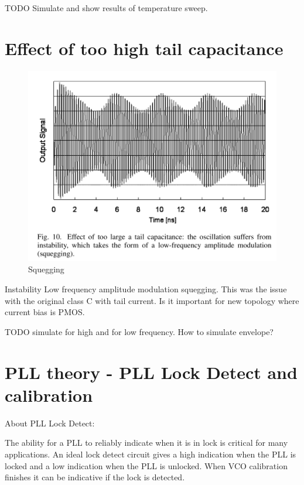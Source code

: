 \documentclass{article}
\begin{document}

TODO Simulate and show results of temperature sweep.


\section{Effect of too high tail capacitance}

\begin{figure}[!ht]
	\includegraphics[width=\linewidth]{Figures/squegging.png}
	\caption{Squegging}
	\label{fig:squegging}
\end{figure}

Instability Low frequency amplitude modulation squegging. This was the issue with the original class C with tail current. Is it important for new topology where current bias is PMOS.

TODO simulate for high and for low frequency. How to simulate envelope? 

\section{PLL theory - PLL Lock Detect and calibration}

About PLL Lock Detect:

\begin{info} %
	The ability for a PLL to reliably indicate when it is in lock is critical for many applications. An ideal lock detect circuit gives a high indication when the PLL is locked and a low indication when the PLL is unlocked. When VCO calibration finishes it can be indicative if the lock is detected. 
\end{info}
\end{document}
